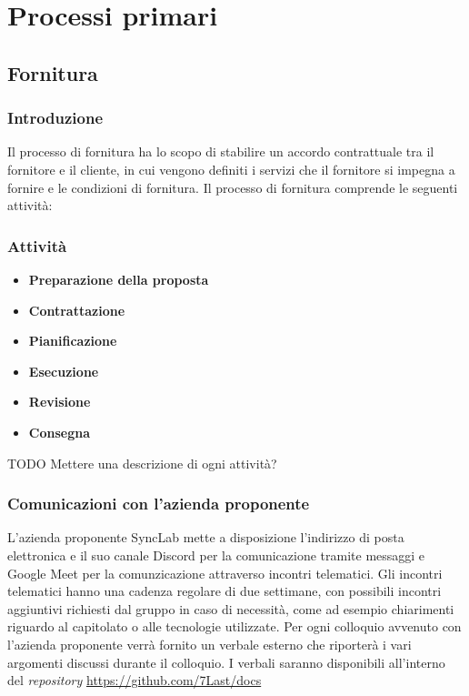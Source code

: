 \section{Processi primari}
\subsection{Fornitura}
\subsubsection{Introduzione}
Il processo di fornitura ha lo scopo di stabilire un accordo contrattuale tra il fornitore e il cliente, in cui vengono definiti i servizi che il fornitore si impegna a fornire e le condizioni di fornitura. 
Il processo di fornitura comprende le seguenti attività:
\subsubsection{Attività}
\begin{itemize}
	\itemsep0em
	\item \textbf{Preparazione della proposta}
	\item \textbf{Contrattazione}
	\item \textbf{Pianificazione}
	\item \textbf{Esecuzione}
	\item \textbf{Revisione}
	\item \textbf{Consegna}
\end{itemize}
TODO Mettere una descrizione di ogni attività?

\subsubsection{Comunicazioni con l'azienda proponente}
L'azienda proponente SyncLab mette a disposizione l'indirizzo di posta elettronica e il suo canale Discord per la comunicazione tramite messaggi e Google Meet per la comunzicazione attraverso incontri telematici.
Gli incontri telematici hanno una cadenza regolare di due settimane, con possibili incontri aggiuntivi richiesti dal gruppo in caso di necessità, come ad esempio chiarimenti riguardo al capitolato o alle tecnologie utilizzate.
Per ogni colloquio avvenuto con l'azienda proponente verrà fornito un verbale esterno che riporterà i vari argomenti discussi durante il colloquio.
I verbali saranno disponibili all'interno del \textit{repository} \url{https://github.com/7Last/docs}
